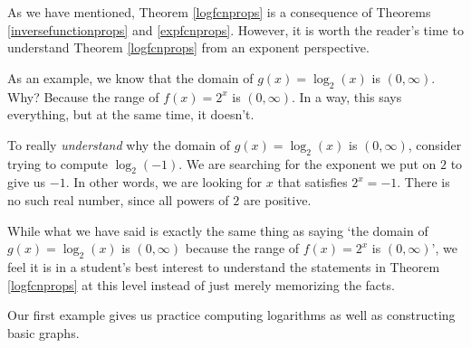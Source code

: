 As we have mentioned, Theorem \ref{logfcnprops} is a consequence of Theorems \ref{inversefunctionprops} and \ref{expfcnprops}.  However, it is worth the reader's time to understand Theorem \ref{logfcnprops} from an exponent perspective.  


\smallskip

As an example, we know that the domain of $g(x) = \log_{2}(x)$ is $(0,\infty)$.  Why?  Because the range of $f(x) = 2^{x}$ is $(0,\infty)$.  In a way, this says everything, but at the same time, it doesn't. 

\smallskip

To really \textit{understand} why the domain of $g(x) = \log_{2}(x)$ is $(0,\infty)$,  consider trying to compute $\log_{2}(-1)$.   We are searching for the exponent we put on $2$ to give us $-1$.  In other words, we are looking for $x$ that satisfies $2^{x} = -1$.  There is no such real number, since all powers of $2$ are positive. 

\smallskip

 While what we have said is exactly the same thing as saying `the domain of $g(x) = \log_{2}(x)$ is $(0,\infty)$ because the range of $f(x) = 2^{x}$ is $(0,\infty)$', we feel it is in a student's best interest to understand the statements in Theorem \ref{logfcnprops} at this level instead of just merely memorizing the facts.
 
\smallskip
 
 Our first example gives us practice computing logarithms as well as constructing basic graphs.
 
\newpage

